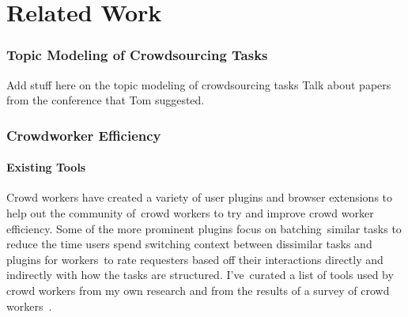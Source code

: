 \documentclass[letterpaper,12pt]{article}
\begin{document}
\chapter{Related Work}

\subsection{Topic Modeling of Crowdsourcing Tasks}
Add stuff here on the topic modeling of crowdsourcing tasks
Talk about papers from the conference that Tom suggested.
\subsection{Crowdworker Efficiency}
\subsubsection{Existing Tools}
Crowd workers have created a variety of user plugins and browser extensions to help out the community of\
crowd workers to try and improve crowd worker efficiency. Some of the more prominent plugins focus on batching\
similar tasks to reduce the time users spend switching context between dissimilar tasks and plugins for workers\
to rate requesters based off their interactions directly and indirectly with how the tasks are structured. I've\
curated a list of tools used by crowd workers from my own research and from the results of a survey of crowd workers\
\cite{Kaplan2018}. 
\end{document}
